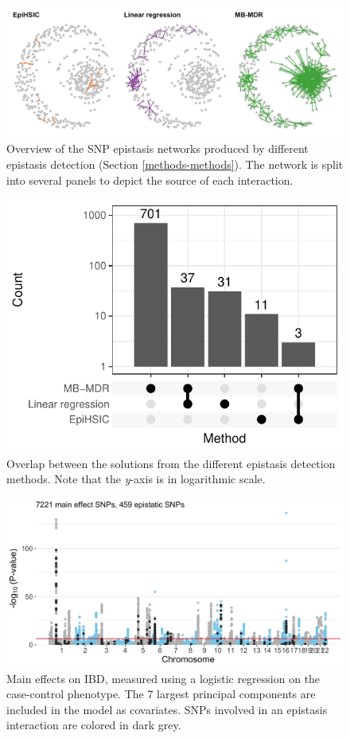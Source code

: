 \documentclass[
  11pt,
]{env/yjiao}
\begin{document}
\begin{figure}
\centering
\includegraphics{fig/overview_snp_solutions.png}
\caption{\label{fig:overview}Overview of the SNP epistasis networks produced by different epistasis detection (Section \ref{methods-methods}). The network is split into several panels to depict the source of each interaction.}
\end{figure}



\begin{figure}

{\centering \includegraphics[width=0.6\linewidth]{fig/overlap_solutions} 

}

\caption{Overlap between the solutions from the different epistasis detection methods. Note that the \emph{y}-axis is in logarithmic scale.}\label{fig:solutions-overlap}
\end{figure}



\begin{figure}
\centering
\includegraphics{fig/manhattan_epistasis.png}
\caption{\label{fig:main-effect-overlap}Main effects on IBD, measured using a logistic regression on the case-control phenotype. The 7 largest principal components are included in the model as covariates. SNPs involved in an epistasis interaction are colored in dark grey.}
\end{figure}
\end{document}
